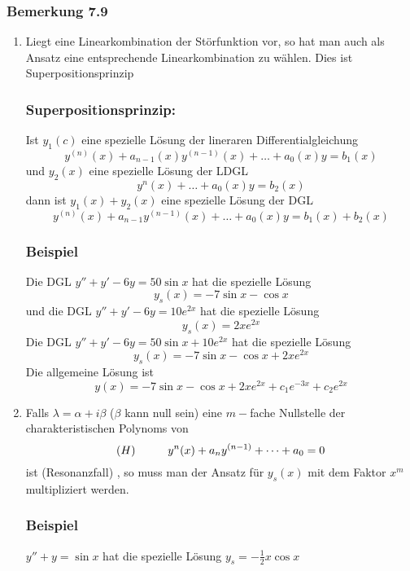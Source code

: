 \subsubsection*{Bemerkung 7.9}
\begin{enumerate}
\item {}Liegt eine Linearkombination der Störfunktion vor, so hat man auch als Ansatz eine entsprechende Linearkombination zu wählen. Dies ist Superpositionsprinzip
\subsubsection*{Superpositionsprinzip:}
Ist $y_1(c)$ eine spezielle Lösung der lineraren Differentialgleichung \[y^{(n)}(x)+a_{n-1}(x)y^{(n-1)}(x)+\dots +a_0(x)y=b_1(x)\] und $y_2(x)$ eine spezielle Lösung der LDGL \[y^n(x)+\dots +a_0(x)y=b_2(x)\] dann ist $y_1(x)+y_2(x)$ eine spezielle Lösung der DGL \[y^{(n)}(x)+a_{n-1}y^{(n-1)}(x)+\dots+a_0(x)y=b_1(x)+b_2(x)\]
\subsubsection*{Beispiel}
Die DGL $y''+y'-6y=50\sin x$ hat die spezielle Lösung \[y_s(x)=-7\sin x-\cos x\] und die DGL $y''+y'-6y=10e^{2x}$ hat die spezielle Lösung \[y_s(x)=2xe^{2x}\]Die DGL $y''+y'-6y=50\sin x+10e^{2x}$ hat die spezielle Lösung \[y_s(x)=-7\sin x-\cos x+2xe^{2x}\] Die allgemeine Lösung ist \[y(x)=-7\sin x -\cos x+2xe^{2x}+c_1e^{-3x}+c_2e^{2x}\]
\item Falls $\lambda=\alpha +i\beta$ ($\beta$ kann null sein) eine $m-$fache Nullstelle der charakteristischen Polynoms von \[(H)\hspace{10mm}y^n(x)+a_ny^{(n-1)}+\dots +a_0=0\]ist (Resonanzfall) , so muss man der Ansatz für $y_s(x)$ mit dem Faktor $x^m$ multipliziert werden.
\subsubsection*{Beispiel}
$y''+y=\sin x$ hat die spezielle Lösung $y_s=-\frac{1}{2}x\cos x$



\begin{figure}[ht]
\begin{minipage}[b]{0.45\linewidth}
\begin{center}
\end{center}
\end{minipage}
\hspace{0.5cm}
\begin{minipage}[b]{0.45\linewidth}


\end{minipage}
\end{figure}
\end{enumerate}
